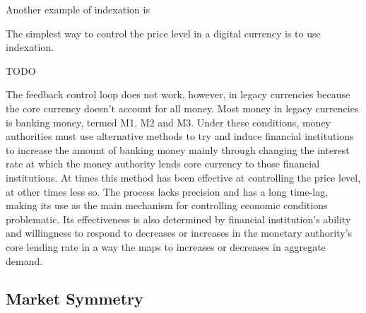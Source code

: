 Another example of indexation is 

The simplest way to control the price level in a digital currency is to use indexation.





TODO

The feedback control loop does not work, however, in legacy currencies because the core currency
doesn't account for all money. Most money in legacy currencies is banking money, termed M1, M2 and
M3. Under these conditions, money authorities must use alternative methods to try and induce
financial institutions to increase the amount of banking money mainly through changing the interest
rate at which the money authority lends core currency to those financial institutions. At times this
method has been effective at controlling the price level, at other times less so. The process lacks
precision and has a long time-lag, making its use as the main mechanism for controlling economic
conditions problematic. Its effectiveness is also determined by financial institution's ability and
willingness to respond to decreases or increases in the monetary authority's core lending rate in a
way the maps to increases or decreases in aggregate demand.

\subsection{Market Symmetry}

